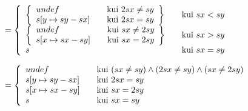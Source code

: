 \(
= 
\left\{ \begin{array}{l l}
    \left\{ \begin{array}{l l}
        undef & \quad \text{kui}\ 2sx \neq sy \\
        s[y \mapsto sy - sx] & \quad \text{kui}\ 2sx = sy
    \end{array} \right\} & \quad \text{kui}\ sx < sy
    \\
    \left\{ \begin{array}{l l}
        undef & \quad \text{kui}\ sx \neq 2sy \\
        s[x \mapsto sx - sy] & \quad \text{kui}\ sx = 2sy\\
    \end{array} \right\} & \quad \text{kui}\ sx > sy
  \\
  s
  & \quad \text{kui}\ sx = sy\\
  \end{array} \right.
\)

\(
= 
\left\{
  \begin{array}{l l}
  undef                & \quad \text{kui}\ (sx \neq sy) \wedge (2sx \neq sy) \wedge (sx \neq 2sy)\\
  s[y \mapsto sy - sx] & \quad \text{kui}\ 2sx = sy \\
  s[x \mapsto sx - sy] & \quad \text{kui}\ sx = 2sy \\
  s                    & \quad \text{kui}\ sx = sy\\
  \end{array}
\right.
\)

